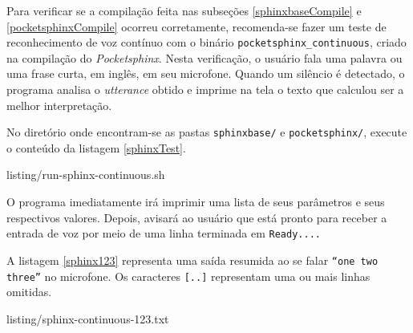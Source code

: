Para verificar se a compilação feita nas subseções \ref{sphinxbaseCompile} e \ref{pocketsphinxCompile} ocorreu corretamente, recomenda-se fazer um teste de reconhecimento de voz contínuo com o binário \texttt{pocketsphinx\_continuous}, criado na compilação do \textit{Pocketsphinx}. Nesta verificação, o usuário fala uma palavra ou uma frase curta, em inglês, em seu microfone. Quando um silêncio é detectado, o programa analisa o \textit{utterance} obtido e imprime na tela o texto que calculou ser a melhor interpretação.

No diretório onde encontram-se as pastas \texttt{sphinxbase/} e \texttt{pocketsphinx/}, execute o conteúdo da listagem \ref{sphinxTest}.


  {listing/run-sphinx-continuous.sh}

O programa imediatamente irá imprimir uma lista de seus parâmetros e seus respectivos valores. Depois, avisará ao usuário que está pronto para receber a entrada de voz por meio de uma linha terminada em \texttt{Ready....}

A listagem \ref{sphinx123} representa uma saída resumida ao se falar \texttt{``one two three''} no microfone. Os caracteres \texttt{[..]} representam uma ou mais linhas omitidas.


  {listing/sphinx-continuous-123.txt}
